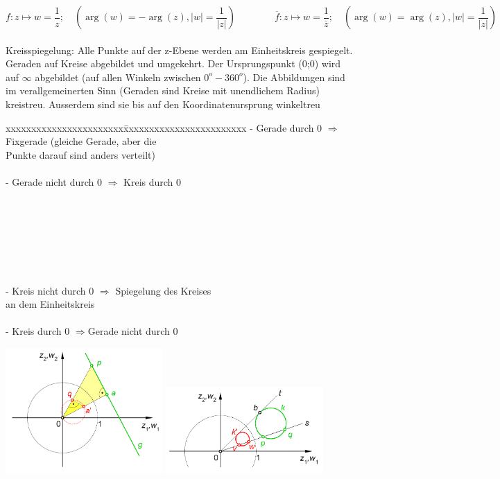 	$$ f : z \mapsto w = \frac{1}{z}; \quad (\arg(w) = -\arg(z), |w| = \frac{1}{|z|})
	\qquad \qquad 
	\overline{f}: z \mapsto w = \frac{1}{\overline{z}};  \quad  
	(\arg(w) = \arg(z), |w| = \frac{1}{|z|}) $$\\
	Kreisspiegelung: Alle Punkte auf der z-Ebene werden am Einheitskreis gespiegelt.
	Geraden auf Kreise abgebildet und umgekehrt. Der Ursprungspunkt (0;0) wird auf
	$ \infty $ abgebildet (auf allen Winkeln zwischen $0^o-360^o$). Die
	Abbildungen sind
	im verallgemeinerten Sinn (Geraden sind Kreise mit unendlichem Radius)
	kreistreu. Ausserdem sind sie bis auf den Koordinatenursprung winkeltreu\\
	\begin{minipage}{9cm}
		\begin{tabbing}
        	xxxxxxxxxxxxxxxxxxxxxxx\=xxxxxxxxxxxxxxxxxxxxxxxx\kill
	        - Gerade durch 0 $\Longrightarrow$ \>Fixgerade (gleiche Gerade, aber
	        die \\ \>Punkte darauf sind anders verteilt)\\ \\
			- Gerade nicht durch 0 $\Longrightarrow$ Kreis durch 0\\ \\ \\ \\ \\ \\ \\ \\
			- Kreis nicht durch 0 $\Longrightarrow$ \>Spiegelung des Kreises\\ \> an dem
			Einheitskreis\\ \\
			- Kreis durch 0 $\Longrightarrow$\>Gerade nicht durch 0
        \end{tabbing}
	\end{minipage}
	\hspace{2cm}
	\begin{minipage}{6cm}
		\includegraphics[width=6cm]{./bilder/GeradeKreisspiegelung.png} 
    	\includegraphics[width=6cm]{./bilder/KreisKreisspiegelung.png}
    \end{minipage}

